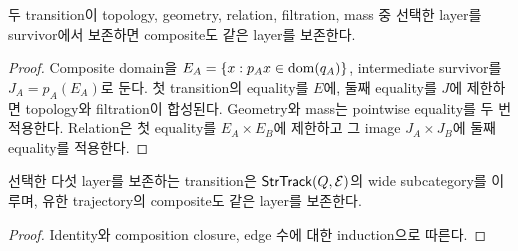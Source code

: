 \begin{theorem}
두 transition이 topology, geometry, relation, filtration, mass 중 선택한 layer를 survivor에서 보존하면 composite도 같은 layer를 보존한다.
\end{theorem}

\begin{proof}
Composite domain을 $E_A=\{x:p_Ax\in\operatorname{dom}(q_A)\}$, intermediate survivor를 $J_A=p_A(E_A)$로 둔다. 첫 transition의 equality를 $E$에, 둘째 equality를 $J$에 제한하면 topology와 filtration이 합성된다. Geometry와 mass는 pointwise equality를 두 번 적용한다. Relation은 첫 equality를 $E_A\times E_B$에 제한하고 그 image $J_A\times J_B$에 둘째 equality를 적용한다.
\end{proof}

\begin{corollary}
선택한 다섯 layer를 보존하는 transition은 $\mathsf{StrTrack}(Q,\mathcal E)$의 wide subcategory를 이루며, 유한 trajectory의 composite도 같은 layer를 보존한다.
\end{corollary}

\begin{proof}
Identity와 composition closure, edge 수에 대한 induction으로 따른다.
\end{proof}
